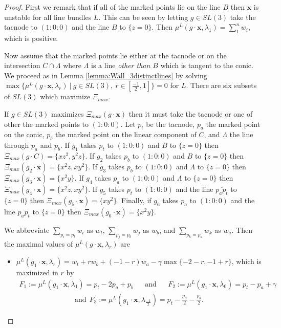 \documentclass[10pt,a4paper]{amsart}
\begin{document}
\begin{proof}
First we remark that if all of the marked points lie on the line $B$ then $\mathbf{x}$ is unstable for all line bundles $L$. This can be seen by letting $g \in SL(3)$ take the tacnode to $(1:0:0)$ and the line $B$ to $\{z=0\}$. Then $\mu^L(g \cdot \mathbf{x}, \lambda_1) = \sum_1^n w_i$, which is positive.

Now assume that the marked points lie either at the tacnode or on the intersection $C \cap \Lambda$ where $\Lambda$ is a line \textit{other than $B$} which is tangent to the conic. We proceed as in Lemma \ref{lemma:Wall_3distinctlines} by solving $\max \{ \mu^L(g \cdot \mathbf{x}, \lambda_r) \ | \ g \in SL(3), \ r \in [\frac{-1}{2}, 1] \} = 0$ for $L$. There are  six subsets of $SL(3)$ which maximize $\Xi_{max}$. 

If $g\in SL(3)$ maximizes $\Xi_{max}(g \cdot \mathbf{x})$ then it must take the tacnode or one of other the marked points to $(1:0:0)$. Let $p_t$ be the tacnode, $p_a$ the marked point on the conic, $p_b$ the marked point on the linear component of $C$, and $\Lambda$ the line through $p_a$ and $p_b$. If $g_1$ takes $p_t$ to $(1:0:0)$ and $B$ to $\{z=0\}$ then $\Xi_{max}( g \cdot C) = \{xz^2, y^2z\}$. If $g_2$ takes $p_b$ to $(1:0:0)$ and $B$ to $\{z=0\}$ then $\Xi_{max} ( g_2 \cdot \mathbf{x}) = \{x^2z,  xy^2 \}$. If $g_3$ takes $p_b$ to $(1:0:0)$ and $\Lambda$ to $\{z=0\}$ then $\Xi_{max} ( g_3 \cdot \mathbf{x}) = \{x^2y\}$. If $g_4$ takes  $p_a$ to $(1:0:0)$ and $\Lambda$ to $\{z=0\}$ then $\Xi_{max} ( g_4 \cdot \mathbf{x}) = \{ x^2z, xy^2\}$. If $g_5$ takes $p_t$ to $(1:0:0)$ and the line $\overline{p_a p_t}$ to $\{z=0\}$ then $\Xi_{max} ( g_5 \cdot \mathbf{x}) = \{ xy^2\}$. Finally, if $g_6$ takes $p_a$ to $(1:0:0)$ and the line $\overline{p_a p_t}$ to $\{z=0\}$ then $\Xi_{max} ( g_6 \cdot \mathbf{x}) = \{x^2y\}$.

We abbreviate $\sum_{p_i = p_t} w_i$ as $w_t$, $\sum_{p_j = p_b} w_j$ as $w_b$, and $\sum_{p_k = p_a} w_k$ as $w_a$. Then the maximal values of $\mu^L( g \cdot \mathbf{x}, \lambda_r)$ are

\begin{itemize}
    \item $\mu^L(g_1 \cdot \mathbf{x}, \lambda_r) = w_t + rw_b +(-1-r)w_a - \gamma \max\{ -2-r, -1+r \}$, which is maximized in $r$ by
     \begin{align*}
        F_1 := \mu^L(g_1 \cdot \mathbf{x}, \lambda_1) = p_t -2p_a +p_b
        && \text{and} &&
        F_2 := \mu^L(g_1 \cdot \mathbf{x}, \lambda_0) = p_t - p_a + \gamma \end{align*}
        \begin{align*} \text{and} \ \ F_3 := \mu^L(g_1 \cdot \mathbf{x}, \lambda_{\frac{-1}{2}}) = p_t - \frac{p_a}{2} - \frac{p_b}{2}.   \end{align*}
    

\end{itemize}
\end{proof}
\end{document}
